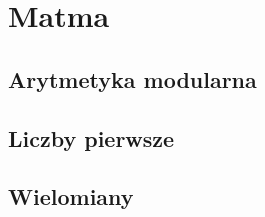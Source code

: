\section{Matma} 

\subsection{Arytmetyka modularna}

\subsection{Liczby pierwsze}

\subsection{Wielomiany}
